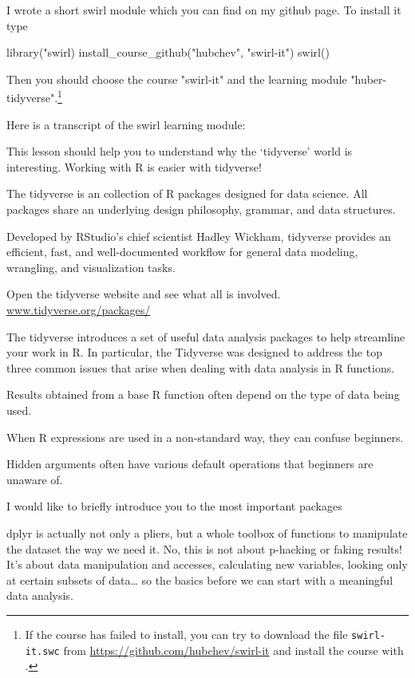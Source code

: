 

I wrote a short swirl module which you can find on my github page. To install it type 
\begin{rblock1}
	library("swirl)
	install_course_github("hubchev", "swirl-it")
	swirl()
\end{rblock1}
Then you should choose the course "swirl-it" and the learning module "huber-tidyverse".\footnote{If the course has failed to install, you can try to download the file \texttt{swirl-it.swc} from \url{https://github.com/hubchev/swirl-it} and install the course with .}

Here is a transcript of the swirl learning module:

This lesson should help you to understand why the ‘tidyverse’ world is interesting. Working with R is easier with tidyverse!

The tidyverse is an collection of R packages designed for data science. All packages share an underlying design philosophy, grammar, and data structures.

Developed by RStudio's chief scientist Hadley Wickham, tidyverse provides an efficient, fast, and well-documented workflow for general data modeling, wrangling, and visualization tasks.

Open the tidyverse website and see what all is involved. \url{www.tidyverse.org/packages/}

The tidyverse introduces a set of useful data analysis packages to help streamline your work in R. In particular, the Tidyverse was designed to address the top three common issues that arise when dealing with data analysis in R functions.

Results obtained from a base R function often depend on the type of data being used.

When R expressions are used in a non-standard way, they can confuse beginners.

Hidden arguments often have various default operations that beginners are unaware of.

I would like to briefly introduce you to the most important packages

dplyr is actually not only a pliers, but a whole toolbox of functions to manipulate the dataset the way we need it. No, this is not about p-hacking or faking results! It’s about data manipulation and accesses, calculating new variables, looking only at certain subsets of data… so the basics before we can start with a meaningful data analysis.

